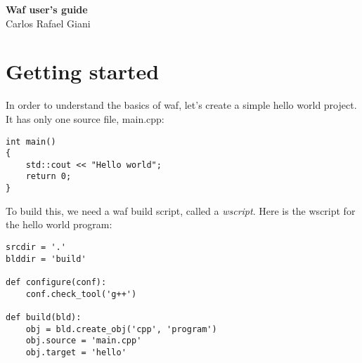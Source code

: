 \documentclass[a4,10pt]{article}
\title{\def\doctitle}
\def\doctitle{Waf user's guide}
\def\authorName{Carlos Rafael Giani}
\begin{document}
\lstset{basicstyle=\small\ttfamily, numberstyle=\footnotesize, captionpos=b}


\begin{titlepage}
	\vspace*{3cm}
	\begin{center}
		{\Huge\textbf{\doctitle}}\\
		\vspace*{0.5cm}
		\authorName
	\end{center}	

\tableofcontents
\end{titlepage}

\newpage

\pagestyle{plain}

\section{Getting started}
In order to understand the basics of waf, let's create a simple hello world project. It has only one source file, main.cpp:

\begin{center}
	\begin{lstlisting}[caption=\footnotesize the main.cpp hello world code]
int main()
{
    std::cout << "Hello world";
    return 0;
}
	\end{lstlisting}
\end{center}

To build this, we need a waf build script, called a \emph{wscript}.
Here is the wscript for the hello world program:

\begin{center}
	\begin{lstlisting}[caption=\footnotesize The hello world wscript]
srcdir = '.'
blddir = 'build'

def configure(conf):
    conf.check_tool('g++')

def build(bld):
    obj = bld.create_obj('cpp', 'program')
    obj.source = 'main.cpp'
    obj.target = 'hello'
	\end{lstlisting}
\end{center}
\end{document}
